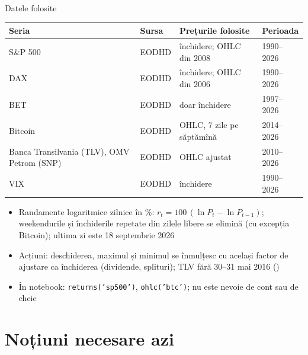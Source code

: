 \begin{frame}{Datele folosite}
\itemsize{\small}
\begin{center}
\footnotesize
\begin{tabular}{llll}
\toprule
\textbf{Seria} & \textbf{Sursa} & \textbf{Prețurile folosite} & \textbf{Perioada} \\
\midrule
S\&P 500 & EODHD & închidere; OHLC din 2008 & 1990--2026 \\
DAX & EODHD & închidere; OHLC din 2006 & 1990--2026 \\
BET & EODHD & doar închidere & 1997--2026 \\
Bitcoin & EODHD & OHLC, 7 zile pe săptămînă & 2014--2026 \\
Banca Transilvania (TLV), OMV Petrom (SNP) & EODHD & OHLC ajustat & 2010--2026 \\
VIX & EODHD & închidere & 1990--2026 \\
\bottomrule
\end{tabular}
\end{center}
\begin{itemize}
    \item Randamente logaritmice zilnice în \%: $r_t = 100\,(\ln P_t - \ln P_{t-1})$; weekendurile și închiderile repetate din zilele libere se elimină (cu excepția Bitcoin); ultima zi este 18 septembrie 2026
    \item Acțiuni: deschiderea, maximul și minimul se înmulțesc cu același factor de ajustare ca închiderea (dividende, splituri); TLV fără 30--31 mai 2016 ()
    \item În notebook: \texttt{returns('sp500')}, \texttt{ohlc('btc')}; nu este nevoie de cont sau de cheie
\end{itemize}
\end{frame}


\section{Noțiuni necesare azi}

